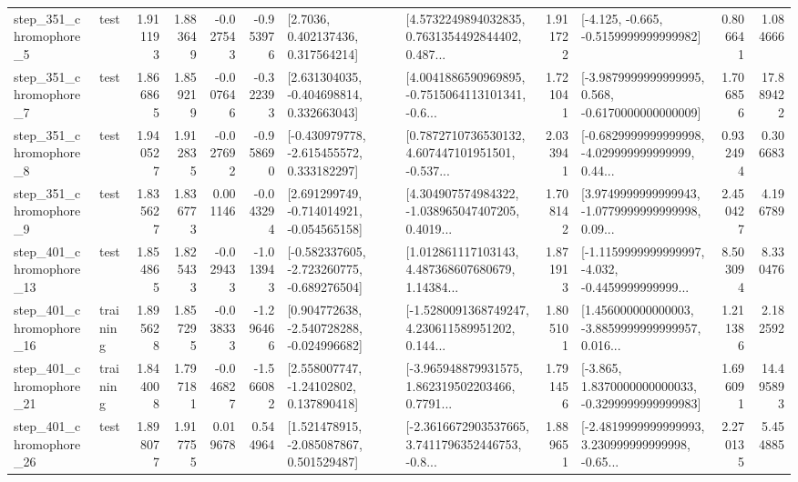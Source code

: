 \begin{tabular}{llrrrrllrlrr}
   step\_351\_chromophore\_5 &      test &      1.911193 &    1.883649 &     -0.027543 & -0.953976 &          [2.7036, 0.402137436, 0.317564214] &  [4.5732249894032835, 0.7631354492844402, 0.487... &       1.911722 &              [-4.125, -0.665, -0.5159999999999982] &            0.806641 &          1.084666 \\
   step\_351\_chromophore\_7 &      test &      1.866865 &    1.859219 &     -0.007646 & -0.322393 &    [2.631304035, -0.404698814, 0.332663043] &  [4.0041886590969895, -0.7515064113101341, -0.6... &       1.721041 &  [-3.9879999999999995, 0.568, -0.6170000000000009] &            1.706856 &         17.889422 \\
   step\_351\_chromophore\_8 &      test &      1.940527 &    1.912835 &     -0.027692 & -0.958690 &   [-0.430979778, -2.615455572, 0.333182297] &  [0.7872710736530132, 4.607447101951501, -0.537... &       2.033941 &  [-0.6829999999999998, -4.029999999999999, 0.44... &            0.932494 &          0.306683 \\
   step\_351\_chromophore\_9 &      test &      1.835627 &    1.836773 &      0.001146 & -0.043294 &   [2.691299749, -0.714014921, -0.054565158] &  [4.304907574984322, -1.038965047407205, 0.4019... &       1.708142 &  [3.9749999999999943, -1.0779999999999998, 0.09... &            2.450427 &          4.196789 \\
  step\_401\_chromophore\_13 &      test &      1.854865 &    1.825433 &     -0.029433 & -1.013943 &  [-0.582337605, -2.723260775, -0.689276504] &  [1.012861117103143, 4.487368607680679, 1.14384... &       1.871913 &  [-1.1159999999999997, -4.032, -0.4459999999999... &            8.503094 &          8.330476 \\
  step\_401\_chromophore\_16 &  training &      1.895628 &    1.857295 &     -0.038333 & -1.296466 &   [0.904772638, -2.540728288, -0.024996682] &  [-1.5280091368749247, 4.230611589951202, 0.144... &       1.805101 &  [1.456000000000003, -3.8859999999999957, 0.016... &            1.211386 &          2.182592 \\
  step\_401\_chromophore\_21 &  training &      1.844008 &    1.797181 &     -0.046827 & -1.566082 &     [2.558007747, -1.24102802, 0.137890418] &  [-3.965948879931575, 1.862319502203466, 0.7791... &       1.791456 &  [-3.865, 1.8370000000000033, -0.3299999999999983] &            1.696091 &         14.495893 \\
  step\_401\_chromophore\_26 &      test &      1.898077 &    1.917755 &      0.019678 &  0.544964 &    [1.521478915, -2.085087867, 0.501529487] &  [-2.3616672903537665, 3.7411796352446753, -0.8... &       1.889651 &  [-2.4819999999999993, 3.230999999999998, -0.65... &            2.270135 &          5.454885 \\

\end{tabular}
